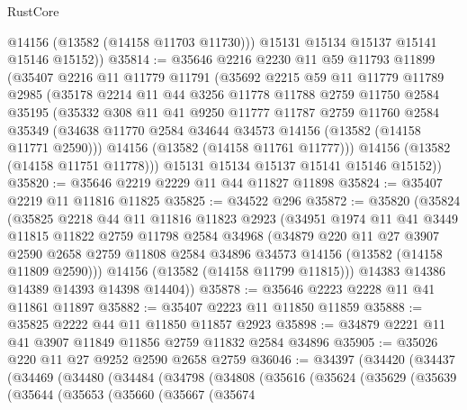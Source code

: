 \begin{lexlean}{RustCore}
\begin{coremodule}
          @14156
          (@13582 (@14158 @11703 @11730)))
        @15131
        @15134
        @15137
        @15141
        @15146
        @15152))
@35814 := @35646
    @2216
    @2230
    @11
    @59
    @11793
    @11899
    (@35407
      @2216
      @11
      @11779
      @11791
      (@35692
        @2215
        @59
        @11
        @11779
        @11789
        @2985
        (@35178
          @2214
          @11
          @44
          @3256
          @11778
          @11788
          @2759
          @11750
          @2584
          @35195
          (@35332
            @308
            @11
            @41
            @9250
            @11777
            @11787
            @2759
            @11760
            @2584
            @35349
            (@34638 @11770 @2584 @34644 @34573 @14156 (@13582 (@14158 @11771 @2590)))
            @14156
            (@13582 (@14158 @11761 @11777)))
          @14156
          (@13582 (@14158 @11751 @11778)))
        @15131
        @15134
        @15137
        @15141
        @15146
        @15152))
@35820 := @35646 @2219 @2229 @11 @44 @11827 @11898
@35824 := @35407 @2219 @11 @11816 @11825
@35825 := @34522 @296
@35872 := @35820
    (@35824
      (@35825
        @2218
        @44
        @11
        @11816
        @11823
        @2923
        (@34951
          @1974
          @11
          @41
          @3449
          @11815
          @11822
          @2759
          @11798
          @2584
          @34968
          (@34879
            @220
            @11
            @27
            @3907
            @2590
            @2658
            @2759
            @11808
            @2584
            @34896
            @34573
            @14156
            (@13582 (@14158 @11809 @2590)))
          @14156
          (@13582 (@14158 @11799 @11815)))
        @14383
        @14386
        @14389
        @14393
        @14398
        @14404))
@35878 := @35646 @2223 @2228 @11 @41 @11861 @11897
@35882 := @35407 @2223 @11 @11850 @11859
@35888 := @35825 @2222 @44 @11 @11850 @11857 @2923
@35898 := @34879 @2221 @11 @41 @3907 @11849 @11856 @2759 @11832 @2584 @34896
@35905 := @35026 @220 @11 @27 @9252 @2590 @2658 @2759
@36046 := @34397
    (@34420
      (@34437
        (@34469
          (@34480
            (@34484
              (@34798
                (@34808
                  (@35616
                    (@35624
                      (@35629
                        (@35639
                          (@35644
                            (@35653
                              (@35660
                                (@35667
                                  (@35674

\end{coremodule}
\end{lexlean}
